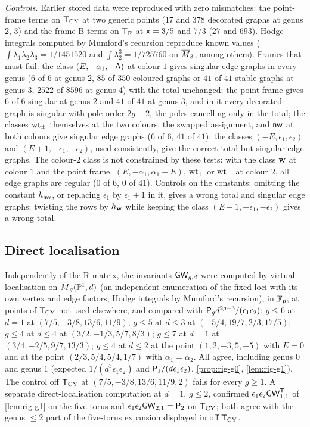 \emph{Controls.} Earlier stored data were reproduced with zero mismatches: the point-frame terms on $\mathsf{T}_{\mathrm{CY}}$ at two generic points ($17$ and $378$ decorated graphs at genus 2, 3) and the frame-B terms on $\mathsf{T}_{\mathrm{F}}$ at $\mathsf{x}=3/5$ and $7/3$ ($27$ and $693$). Hodge integrals computed by Mumford's recursion reproduce known values ($\int\lambda_1\lambda_2\lambda_3=1/1451520$ and $\int\lambda_2^3=1/725760$ on $\overline{M}_3$, among others). Frames that must fail: the class $(E,-\alpha_1,-\mathsf{A})$ at colour $1$ gives singular edge graphs in every genus ($6$ of $6$ at genus 2, $85$ of $350$ coloured graphs or $41$ of $41$ stable graphs at genus 3, $2522$ of $8596$ at genus 4) with the total unchanged; the point frame gives $6$ of $6$ singular at genus 2 and $41$ of $41$ at genus 3, and in it every decorated graph is singular with pole order $2g-2$, the poles cancelling only in the total; the classes $\mathrm{wt}_\pm$ themselves at the two colours, the swapped assignment, and $\mathsf{nw}$ at both colours give singular edge graphs ($6$ of $6$, $41$ of $41$); the classes $(-E,\epsilon_1,\epsilon_2)$ and $(E+1,-\epsilon_1,-\epsilon_2)$, used consistently, give the correct total but singular edge graphs. The colour-$2$ class is not constrained by these tests: with the class $\mathbf{w}$ at colour $1$ and the point frame, $(E,-\alpha_1,\alpha_1-E)$, $\mathrm{wt}_+$ or $\mathrm{wt}_-$ at colour $2$, all edge graphs are regular ($0$ of $6$, $0$ of $41$). Controls on the constants: omitting the constant $h_{\mathsf{nw}}$, or replacing $\epsilon_1$ by $\epsilon_1+1$ in it, gives a wrong total and singular edge graphs; twisting the rows by $h_{\mathbf{w}}$ while keeping the class $(E+1,-\epsilon_1,-\epsilon_2)$ gives a wrong total.

\subsection{Direct localisation}
\label{sec:evi-loc}

Independently of the R-matrix, the invariants $\mathsf{GW}_{g,d}$ were computed by virtual localisation on $\overline{M}_g(\mathbb{P}^1,d)$ (an independent enumeration of the fixed loci with its own vertex and edge factors; Hodge integrals by Mumford's recursion), in $\mathbb{F}_p$, at points of $\mathsf{T}_{\mathrm{CY}}$ not used elsewhere, and compared with $\mathsf{P}_{g} d^{2g-3}/(\epsilon_1\epsilon_2)$: $g\leq 6$ at $d=1$ at $(7/5,-3/8,13/6,11/9)$; $g\leq 5$ at $d\leq 3$ at $(-5/4,19/7,2/3,17/5)$; $g\leq 4$ at $d\leq 4$ at $(3/2,-1/3,5/7,8/3)$; $g\leq 7$ at $d=1$ at $(3/4,-2/5,9/7,13/3)$; $g\leq 4$ at $d\leq 2$ at the point $(1,2,-3,5,-5)$ with $E=0$ and at the point $(2/3,5/4,5/4,1/7)$ with $\alpha_1=\alpha_2$. All agree, including genus $0$ and genus $1$ (expected $1/(d^3\epsilon_1\epsilon_2)$ and $\mathsf{P}_{1}/(d\epsilon_1\epsilon_2)$, \cref{prop:rig-g0}, \cref{lem:rig-g1}). The control off $\mathsf{T}_{\mathrm{CY}}$ at $(7/5,-3/8,13/6,11/9,2)$ fails for every $g\geq 1$. A separate direct-localisation computation at $d=1$, $g\leq 2$, confirmed $\epsilon_1\epsilon_2\mathsf{GW}^{\mathsf{T}}_{1,1}$ of \cref{lem:rig-g1} on the five-torus and $\epsilon_1\epsilon_2\mathsf{GW}_{2,1}=\mathsf{P}_{2}$ on $\mathsf{T}_{\mathrm{CY}}$; both agree with the genus $\leq 2$ part of the five-torus expansion displayed in \cite{BS} off $\mathsf{T}_{\mathrm{CY}}$. 

